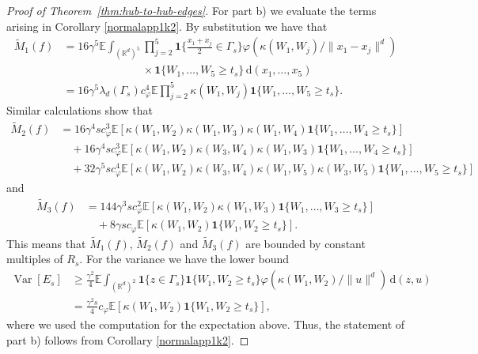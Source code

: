 \documentclass{article}
\theoremstyle{definition}
\numberwithin{equation}{section}
\theoremstyle{remark}
\begin{document}
\begin{proof}[Proof of Theorem~\ref{thm:hub-to-hub-edges}]
For part b) we evaluate the terms arising in Corollary \ref{normalapp1k2}. By substitution we have that
\begin{align*}
\widetilde{M}_1(f) & =16\gamma^5 \mathbb{E}\int_{(\mathbb{R}^d)^5} \prod_{j=2}^5 \mathbf{1}\bigg\{ \frac{x_1+x_j}{2}\in\Gamma_s \bigg\} \varphi(\kappa(W_1,W_j)/\|x_1-x_j\|^d) \\
& \hspace{3cm} \times \mathbf{1}\{W_1,\ldots,W_5\geq t_s\} \, \mathrm{d}(x_1,\ldots,x_5) \\
& =16\gamma^5 \lambda_d(\Gamma_s) c_\varphi^4 \mathbb{E} \prod_{j=2}^5 \kappa(W_1,W_j) \mathbf{1}\{W_1,\ldots,W_5\geq t_s\}.
\end{align*}
Similar calculations show that
\begin{align*}
\widetilde{M}_2(f) & = 16 \gamma^4 s c_\varphi^3 \mathbb{E}[ \kappa(W_1,W_2) \kappa(W_1,W_3) \kappa(W_1,W_4) \mathbf{1}\{W_1,\ldots,W_4\geq t_s\} ] \\
& \quad + 16 \gamma^4 s c_\varphi^3 \mathbb{E}[ \kappa(W_1,W_2) \kappa(W_3,W_4) \kappa(W_1,W_3) \mathbf{1}\{W_1,\ldots,W_4\geq t_s\}] \\
& \quad + 32 \gamma^5 s c_\varphi^4 \mathbb{E}[\kappa(W_1,W_2) \kappa(W_3,W_4) \kappa(W_1,W_5)\kappa(W_3,W_5) \mathbf{1}\{W_1,\ldots,W_5\geq t_s\}] 
\end{align*}
and
\begin{align*}
\widetilde{M}_3(f) & = 144 \gamma^3 s c_\varphi^2  \mathbb{E}[\kappa(W_1,W_2)\kappa(W_1,W_3) \mathbf{1}\{W_1,\ldots,W_3\geq t_s\}] \\
& \quad + 8\gamma s c_\varphi \mathbb{E}[\kappa(W_1,W_2) \mathbf{1}\{W_1,W_2\geq t_s\}].
\end{align*}
This means that $\widetilde{M}_1(f)$, $\widetilde{M}_2(f)$ and $\widetilde{M}_3(f)$ are bounded by constant multiples of $R_s$. For the variance we have the lower bound
\begin{align*}
\operatorname{Var}[E_s] & \geq \frac{\gamma^2}{4} \mathbb{E} \int_{(\mathbb{R}^d)^2} \mathbf{1}\{z\in \Gamma_s\} \mathbf{1}\{W_1,W_2\geq t_s\}  \varphi(\kappa(W_1,W_2)/\|u\|^d) \, \mathrm{d}(z,u) \\
& = \frac{\gamma^2 s}{4} c_\varphi \mathbb{E}[\kappa(W_1,W_2) \mathbf{1}\{W_1,W_2\geq t_s\}],
\end{align*}
where we used the computation for the expectation above. Thus, the statement of part b) follows from Corollary \ref{normalapp1k2}.
\end{proof}
\end{document}
